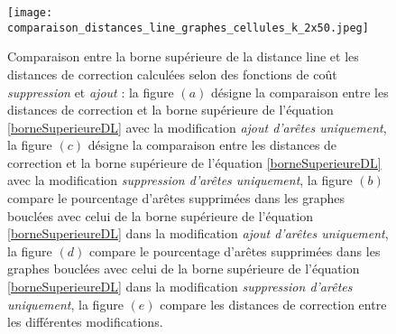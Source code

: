 \begin{figure}[htb!] 
\centering
\texttt{[image: comparaison\_distances\_line\_graphes\_cellules\_k\_2x50.jpeg]}
\caption{Comparaison entre la borne sup\'erieure de la distance line et les distances de correction calcul\'ees selon des fonctions de co\^ut {\em suppression} et  {\em ajout} : 
la figure $(a)$ d\'esigne la comparaison entre les distances de correction et la borne sup\'erieure de l'\'equation \ref{borneSuperieureDL} avec la modification {\em ajout d'ar\^etes uniquement}, 
la figure $(c)$ d\'esigne la comparaison entre les distances de correction et la borne sup\'erieure de l'\'equation \ref{borneSuperieureDL} avec la modification {\em suppression d'ar\^etes uniquement}, 
la figure $(b)$ compare le pourcentage d'ar\^etes supprim\'ees  dans les graphes boucl\'ees avec celui de la borne sup\'erieure de l'\'equation \ref{borneSuperieureDL} dans la modification {\em ajout d'ar\^etes uniquement}, 
la figure $(d)$ compare le pourcentage d'ar\^etes supprim\'ees  dans les graphes boucl\'ees avec celui de la borne sup\'erieure de l'\'equation \ref{borneSuperieureDL} dans la modification {\em suppression d'ar\^etes uniquement},
la figure $(e)$ compare les distances de correction entre les diff\'erentes modifications.
}
\label{comparaison_distances_line_graphes_cellules_k_2x50}
\end{figure}


